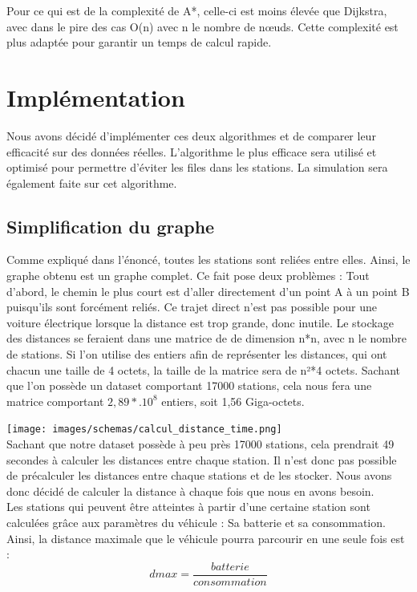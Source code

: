 \documentclass[12pt,titlepage]{report}
\begin{document}
Pour ce qui est de la complexité de A*, celle-ci est moins élevée que Dijkstra, avec dans le pire des cas O(n) avec n le nombre de nœuds. Cette complexité est plus adaptée pour garantir un temps de calcul rapide.


\section{Implémentation}

Nous avons décidé d’implémenter ces deux algorithmes et de comparer leur efficacité sur des données réelles. L’algorithme le plus efficace sera utilisé et optimisé pour permettre d’éviter les files dans les stations. La simulation sera également faite sur cet algorithme.


\subsection{Simplification du graphe}

Comme expliqué dans l’énoncé, toutes les stations sont reliées entre elles. 
Ainsi, le graphe obtenu est un graphe complet. Ce fait pose deux problèmes :
Tout d’abord, le chemin le plus court est d’aller directement d’un point A à un point B puisqu’ils sont forcément reliés. Ce trajet direct n’est pas possible pour une voiture électrique lorsque la distance est trop grande, donc inutile.
Le stockage des distances se feraient dans une matrice de de dimension n*n, avec n le nombre de stations. Si l’on utilise des entiers afin de représenter les distances, qui ont chacun une taille de 4 octets, la taille de la matrice sera de n²*4 octets. Sachant que l’on possède un dataset comportant 17000 stations, cela nous fera une matrice comportant $2,89*.10^8$  entiers, soit 1,56 Giga-octets.

\texttt{[image: images/schemas/calcul\_distance\_time.png]}\\

Sachant que notre dataset possède à peu près 17000 stations, cela prendrait 49 secondes à calculer les distances entre chaque station. 
Il n'est donc pas possible de précalculer les distances entre chaque stations et de les stocker. Nous avons donc décidé de calculer la distance à chaque fois que nous en avons besoin.
\\

Les stations qui peuvent être atteintes à partir d'une certaine station sont calculées grâce aux paramètres du véhicule : Sa batterie et sa consommation. Ainsi, la distance maximale que le véhicule pourra parcourir en une seule fois est :
\[dmax = \frac{batterie}{consommation}\]
\end{document}
